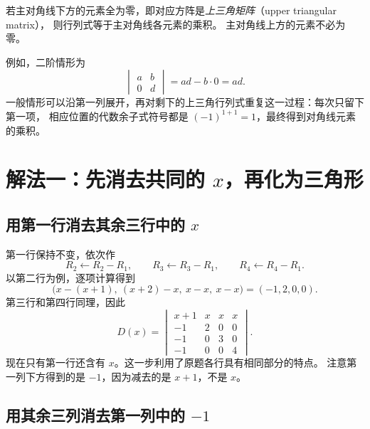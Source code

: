 \documentclass[UTF8,12pt,a4paper,fontset=fandol]{ctexart}
\begin{document}
\begin{property}[三角行列式]
\label{prop:triangular}
若主对角线下方的元素全为零，即对应方阵是\emph{上三角矩阵}（upper triangular matrix），
则行列式等于主对角线各元素的乘积。
主对角线上方的元素不必为零。
\end{property}

例如，二阶情形为
\[
  \begin{vmatrix}a&b\\0&d\end{vmatrix}=ad-b\cdot0=ad.
\]
一般情形可以沿第一列展开，再对剩下的上三角行列式重复这一过程：每次只留下第一项，
相应位置的代数余子式符号都是 $(-1)^{1+1}=1$，最终得到对角线元素的乘积。

\section{解法一：先消去共同的 $x$，再化为三角形}
\label{sec:elimination}

\subsection{用第一行消去其余三行中的 $x$}

第一行保持不变，依次作
\[
  R_2\leftarrow R_2-R_1,\qquad
  R_3\leftarrow R_3-R_1,\qquad
  R_4\leftarrow R_4-R_1.
\]
以第二行为例，逐项计算得到
\[
  \bigl(x-(x+1),\ (x+2)-x,\ x-x,\ x-x\bigr)
  =(-1,2,0,0).
\]
第三行和第四行同理，因此
\begin{equation}
  D(x)=\begin{vmatrix}
    x+1&x&x&x\\
    -1&2&0&0\\
    -1&0&3&0\\
    -1&0&0&4
  \end{vmatrix}.
  \label{eq:row-reduced}
\end{equation}
现在只有第一行还含有 $x$。这一步利用了原题各行具有相同部分的特点。
注意第一列下方得到的是 $-1$，因为减去的是 $x+1$，不是 $x$。

\subsection{用其余三列消去第一列中的 $-1$}
\end{document}
